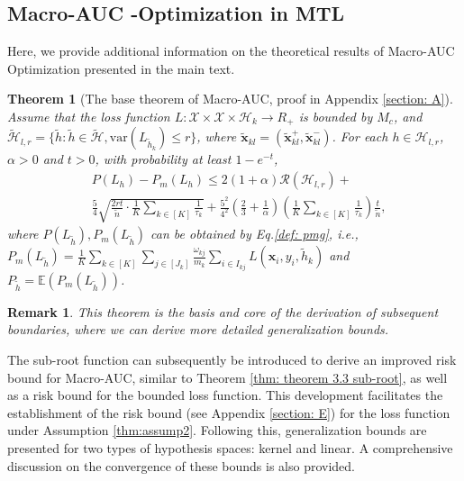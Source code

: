 \documentclass{article}
\def\vx{{\mathbf{x}}}
\def\eE{\mathbb{E}}
\newtheorem{theorem}{Theorem}
\newtheorem*{remark}{Remark}
\begin{document}
\subsection{Macro-AUC -Optimization in MTL}
Here, we provide additional information on the theoretical results of Macro-AUC Optimization presented in the main text.
\label{pro:macro-auc-appendix}
\begin{theorem}[The base theorem of Macro-AUC, proof in Appendix \ref{section: A}]\label{thm: base auc} Assume that the loss function $L : \mathcal{X} \times \mathcal{X} \times \mathcal{H}_k \rightarrow R_+ $ is bounded by $M_c$, and $\mathcal{\tilde{H}}_ {l,r} = \{ \tilde{h}: \tilde{h} \in \mathcal{\tilde{H}}, \mathrm{var}( L_{\tilde{h}_k}) \leq r \}$, where $\widetilde{\vx}_{kl} = (\widetilde{\vx}_{kl}^+, \widetilde{\vx}_{kl}^-)$. For each $h \in \mathcal{H}_{l,r}$, $\alpha > 0 $ and $t > 0$,  with probability at least $1 - e^{-t}$, 
\begin{align*}
   & P (L_h) - P _m (L_h) \leq  2(1 + \alpha) \mathcal{R}( \mathcal{H}_{l,r}) + \\
   & \frac{5}{4} \sqrt{\frac{2rt}{\tilde{n}} \cdot \frac{1}{K} \sum _{k \in [K]} \frac{1}{\tau_k}} +  \frac{5^2}{4^2} (\frac{2}{3} + \frac{1}{\alpha}) (\frac{1}{K} \sum_{k \in [K]} \frac{1}{\tau_k}) \frac{t}{\tilde{n}},
\end{align*}
where $P(L_{\tilde{h}}), P_m(L_{\tilde{h}})$ can be obtained by Eq.\eqref{def: pmg}, i.e., $P_m(L_{\tilde{h}}) = \frac{1}{K}\sum_{k \in [K]} \sum_{j \in [J_k]}\frac{\omega_{kj}}{m_k} \sum_{i \in {I_{kj}}} L(\vx_i,y_i,\tilde{h}_k)$ and $P_{\tilde{h}} = \eE(P_m (L_{\tilde{h}}))$.
\end{theorem}


\begin{remark}
    This theorem is the basis and core of the derivation of subsequent boundaries, where we can derive more detailed generalization bounds. 
\end{remark}
The sub-root function can subsequently be introduced to derive an improved risk bound for Macro-AUC, similar to Theorem \ref{thm: theorem 3.3 sub-root}, as well as a risk bound for the bounded loss function. This development facilitates the establishment of the risk bound (see Appendix \ref{section: E}) for the loss function under Assumption \ref{thm:assump2}. Following this, generalization bounds are presented for two types of hypothesis spaces: kernel and linear. A comprehensive discussion on the convergence of these bounds is also provided.
\end{document}
